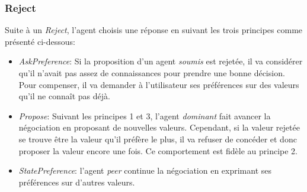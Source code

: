 	\subsubsection{Reject}
	Suite à un \emph{Reject}, l'agent choisis une réponse en suivant les trois principes comme présenté ci-dessous:
	\begin{itemize}
		\item \emph{AskPreference}: Si la proposition d'un agent \emph{soumis} est rejetée, il va considérer qu'il n'avait pas assez de connaissances pour prendre une bonne décision. Pour compenser, il va demander à l'utilisateur ses préférences sur des valeurs qu'il ne connaît pas déjà. 
		
		\item \emph{Propose}: Suivant les principes 1 et 3, l'agent \emph{dominant} fait avancer la négociation en proposant de nouvelles valeurs. Cependant, si la valeur rejetée se trouve être la valeur qu'il préfère le plus, il va refuser de concéder et donc proposer la valeur encore une fois. Ce comportement est fidèle au principe 2. 
		
		\item \emph{StatePreference}: l'agent \emph{peer} continue la négociation en exprimant ses préférences sur d'autres valeurs. 
	\end{itemize}	
	
